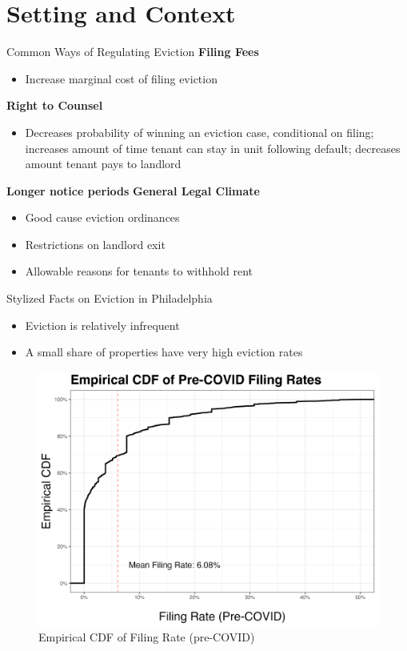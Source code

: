 \documentclass[10pt, xcolor=dvipsnames]{beamer}
\begin{document}
\section{Setting and Context}
\begin{frame}{Common Ways of Regulating Eviction}
    \textbf{Filing Fees}
    \begin{itemize}
        \item Increase marginal cost of filing eviction
    \end{itemize}
    \textbf{Right to Counsel}
    \begin{itemize}
        \item Decreases probability of winning an eviction case, conditional on filing; increases amount of time tenant can stay in unit following default; decreases amount tenant pays to landlord
    \end{itemize}
    \textbf{Longer notice periods}
    \textbf{General Legal Climate}
    \begin{itemize}
        \item Good cause eviction ordinances
        \item Restrictions on landlord exit
        \item Allowable reasons for tenants to withhold rent
    \end{itemize}
    
    
\end{frame}

\begin{frame}{Stylized Facts on Eviction in Philadelphia}
    \begin{itemize}
        \item Eviction is relatively infrequent
        \item A small share of properties have very high eviction rates
    \end{itemize}

    \begin{figure}
        \centering
        \includegraphics[width=0.75\linewidth]{figs/empirical_cdf_filing_rate_preCOVID.png}
        \caption{Empirical CDF of Filing Rate (pre-COVID)}
        \label{fig:ecdf-filings}
    \end{figure}
    
\end{frame}
\end{document}
